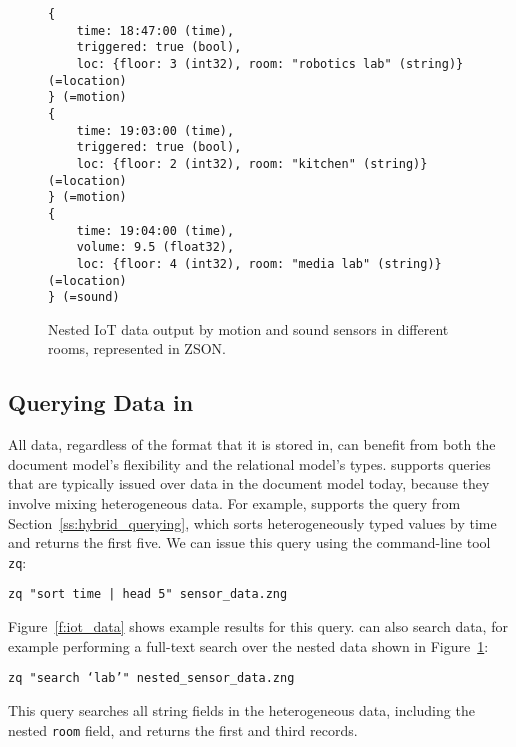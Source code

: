 
\begin{figure}
    \begin{verbatim}
{
    time: 18:47:00 (time),
    triggered: true (bool),
    loc: {floor: 3 (int32), room: "robotics lab" (string)} (=location)
} (=motion)
{
    time: 19:03:00 (time),
    triggered: true (bool),
    loc: {floor: 2 (int32), room: "kitchen" (string)} (=location)
} (=motion)
{
    time: 19:04:00 (time),
    volume: 9.5 (float32),
    loc: {floor: 4 (int32), room: "media lab" (string)} (=location)
} (=sound)
    \end{verbatim}
    \vspace{-1.3em}
    \caption{Nested IoT data output by motion and sound sensors in different rooms, represented in ZSON.}
    \label{f:iot_data_nested}
    \vspace{-1.5em}
\end{figure}

\vspace{-0.9em}
\subsection{Querying Data in \sys{}} \label{ss:zed_querying}

All \sys{} data, regardless of the format that it is stored in, can benefit from both the document model's flexibility and the relational model's types. \sys{} supports queries that are typically issued over data in the document model today, because they involve mixing heterogeneous data. For example, \sys{} supports the query from Section~\ref{ss:hybrid_querying}, which sorts heterogeneously typed values by time and returns the first five. We can issue this query using the command-line tool \texttt{zq}:

\texttt{zq "sort time | head 5" sensor\_data.zng}

\noindent{}Figure~\ref{f:iot_data} shows example results for this query. \sys{} can also search data, for example performing a full-text search over the nested data shown in Figure~\ref{f:iot_data_nested}:

\texttt{zq "search `lab'" nested\_sensor\_data.zng}

\noindent{}This query searches all string fields in the heterogeneous data, including the nested \texttt{room} field, and returns the first and third records.


